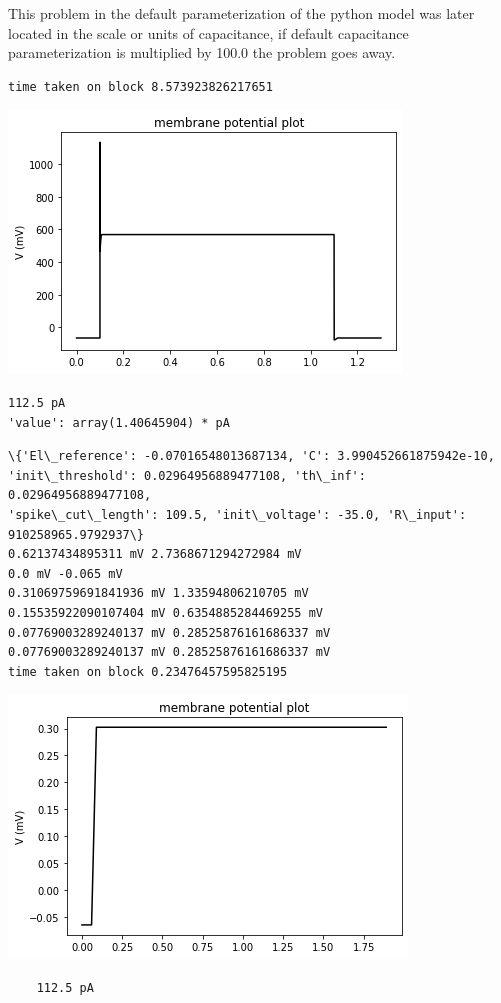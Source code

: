 This problem in the default parameterization of the python model was
later located in the scale or units of capacitance, if default
capacitance parameterization is multiplied by 100.0 the problem goes
away.

    \begin{verbatim}
time taken on block 8.573923826217651
    \end{verbatim}


    
    \begin{center}
\includegraphics{figures/backend_check_files/backend_check_26_2.png}
    \end{center}
\begin{verbatim}
112.5 pA
'value': array(1.40645904) * pA
\end{verbatim}


\begin{verbatim}
\{'El\_reference': -0.07016548013687134, 'C': 3.990452661875942e-10,
'init\_threshold': 0.02964956889477108, 'th\_inf': 0.02964956889477108,
'spike\_cut\_length': 109.5, 'init\_voltage': -35.0, 'R\_input': 910258965.9792937\}
0.62137434895311 mV 2.7368671294272984 mV
0.0 mV -0.065 mV
0.31069759691841936 mV 1.33594806210705 mV
0.15535922090107404 mV 0.6354885284469255 mV
0.07769003289240137 mV 0.28525876161686337 mV
0.07769003289240137 mV 0.28525876161686337 mV
time taken on block 0.23476457595825195
\end{verbatim}

    

    
    \begin{center}
    \includegraphics{backend_check_files/backend_check_28_3.png}
    \end{center}
    \begin{verbatim}
    112.5 pA
    \end{verbatim}


